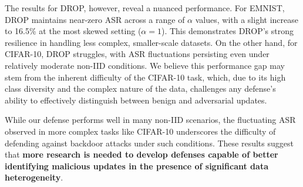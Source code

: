 The results for DROP, however, reveal a nuanced performance. For EMNIST, DROP maintains near-zero ASR across a range of $\alpha$ values, with a slight increase to 16.5\% at the most skewed setting ($\alpha=1$). This demonstrates DROP’s strong resilience in handling less complex, smaller-scale datasets. On the other hand, for CIFAR-10, DROP struggles, with ASR fluctuations persisting even under relatively moderate non-IID conditions. We believe this performance gap may stem from the inherent difficulty of the CIFAR-10 task, which, due to its high class diversity and the complex nature of the data, challenges any defense’s ability to effectively distinguish between benign and adversarial updates.

While our defense performs well in many non-IID scenarios, the fluctuating ASR observed in more complex tasks like CIFAR-10 underscores the difficulty of defending against backdoor attacks under such conditions. These results suggest that \textbf{more research is needed to develop defenses capable of better identifying malicious updates in the presence of significant data heterogeneity}.
